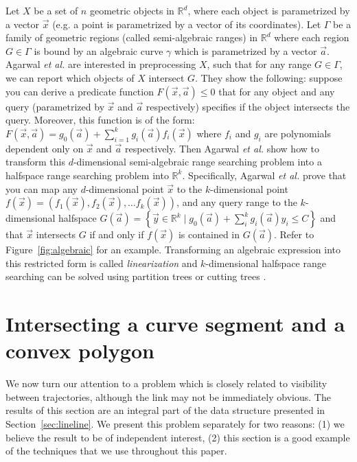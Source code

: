 \documentclass[a4paper, UKenglish]{lipics-v2018}
\newcommand{\etal}{\textit{et al.}\xspace}
\begin{document}
Let $X$ be a set of $n$ geometric objects in $\mathbb{R}^d$, where each object is parametrized by a vector $\vec{x}$ (e.g. a point is parametrized by a vector of its coordinates). Let $\Gamma$ be a family of geometric regions (called semi-algebraic ranges) in $\mathbb{R}^d$ where each region $G \in \Gamma$ is bound by an algebraic curve $\gamma$ which is parametrized by a vector $\vec{a}$. Agarwal \etal \cite{agarwal2013range} are interested in preprocessing $X$, such that for any range $G \in \Gamma$, we can report which objects of $X$ intersect $G$. They show the following: suppose you can derive a predicate function $F(\vec{x}, \vec{a}) \le 0$ that for any object and any query (parametrized by $\vec{x}$ and $\vec{a}$ respectively) specifies if the object intersects the query.  Moreover, this function is of the form: $F(\vec{x}, \vec{a}) =  g_0(\vec{a}) + \sum_{i=1}^k g_i(\vec{a})f_i(\vec{x})$ where $f_i$ and $g_i$ are polynomials dependent only on $\vec{x}$ and $\vec{a}$ respectively. Then Agarwal \etal show how to transform this $d$-dimensional semi-algebraic range searching problem into a halfspace range searching problem into $\mathbb{R}^k$. Specifically, Agarwal \etal prove that you can map any $d$-dimensional point $\vec{x}$ to the $k$-dimensional point $f(\vec{x}) = (f_1(\vec{x}), f_2(\vec{x}), \dots f_k(\vec{x}))$, and any query range to the $k$-dimensional halfspace $G(\vec{a}) = \left\{ \vec{y} \in \mathbb{R}^k \mid g_0(\vec{a})  + \sum_i^k g_i(\vec{a})y_i  \le C \right\}$ and that $\vec{x}$ intersects $G$ if and only if $f(\vec{x})$ is contained in $G(\vec{a})$. Refer to Figure~\ref{fig:algebraic} for an example. Transforming an algebraic expression into this restricted form is called \emph{linearization} and $k$-dimensional halfspace range searching can be solved using partition trees \cite{chan2012optimal} or cutting trees \cite{chazelle1993cutting}.



\section{Intersecting a curve segment and a convex polygon}
\label{sec:intersectionsearch}

We now turn our attention to a problem which is closely related to visibility between trajectories, although the link may not be immediately obvious. The results of this section are an integral part of the data structure presented in Section~\ref{sec:lineline}. We present this problem separately for two reasons: (1) we believe the result to be of independent interest, (2) this section is a good example of the techniques that we use throughout this paper. 
\end{document}
